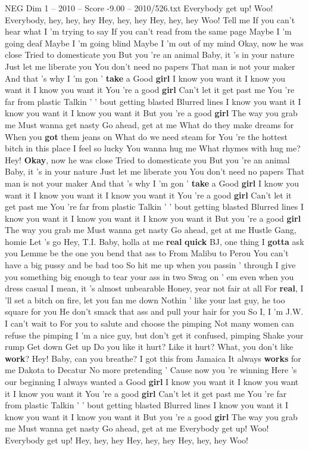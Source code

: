 \begin{textsample}{NEG Dim 1 – 2010 – Score -9.00 – 2010/526.txt}  \label{ex:f1_neg_029}
Everybody get up!
Woo!
Everybody, hey, hey, hey Hey, hey, hey Hey, hey, hey Woo!
Tell me If you can't hear what I 'm trying to say If you can't read from the same page Maybe I 'm going deaf Maybe I 'm going blind Maybe I 'm out of my mind Okay, now he was close Tried to domesticate you But you 're an animal Baby, it 's in your nature Just let me liberate you You don't need no papers That man is not your maker And that 's why I 'm gon ' \textbf{take} a Good \textbf{girl} I know you want it I know you want it I know you want it You 're a good \textbf{girl} Can't let it get past me You 're far from plastic Talkin ' ' bout getting blasted Blurred lines I know you want it I know you want it I know you want it But you 're a good \textbf{girl} The way you grab me Must wanna get nasty Go ahead, get at me What do they make dreams for When you \textbf{got} them jeans on What do we need steam for You 're the hottest bitch in this place I feel so lucky You wanna hug me What rhymes with hug me?
Hey! \textbf{Okay}, now he was close Tried to domesticate you But you 're an animal Baby, it 's in your nature Just let me liberate you You don't need no papers That man is not your maker And that 's why I 'm gon ' \textbf{take} a Good \textbf{girl} I know you want it I know you want it I know you want it You 're a good \textbf{girl} Can't let it get past me You 're far from plastic Talkin ' ' bout getting blasted Blurred lines I know you want it I know you want it I know you want it But you 're a good \textbf{girl} The way you grab me Must wanna get nasty Go ahead, get at me Hustle Gang, homie Let 's go Hey, T.I.
Baby, holla at me \textbf{real} \textbf{quick} BJ, one thing I \textbf{gotta} ask you Lemme be the one you bend that ass to From Malibu to Perou You can't have a big pussy and be bad too So hit me up when you passin ' through I give you something big enough to tear your ass in two Swag on ' em even when you dress casual I mean, it 's almost unbearable Honey, year not fair at all For \textbf{real}, I 'll set a bitch on fire, let you fan me down Nothin ' like your last guy, he too square for you He don't smack that ass and pull your hair for you So I, I 'm J.W.
I can't wait to For you to salute and choose the pimping Not many women can refuse the pimping I 'm a nice guy, but don't get it confused, pimping Shake your rump Get down Get up Do you like it hurt?
Like it hurt?
What, you don't like \textbf{work}?
Hey!
Baby, can you breathe?
I got this from Jamaica It always \textbf{works} for me Dakota to Decatur No more pretending ' Cause now you 're winning Here 's our beginning I always wanted a Good \textbf{girl} I know you want it I know you want it I know you want it You 're a good \textbf{girl} Can't let it get past me You 're far from plastic Talkin ' ' bout getting blasted Blurred lines I know you want it I know you want it I know you want it But you 're a good \textbf{girl} The way you grab me Must wanna get nasty Go ahead, get at me Everybody get up!
Woo!
Everybody get up!
Hey, hey, hey Hey, hey, hey Hey, hey, hey Woo!

\end{textsample}
